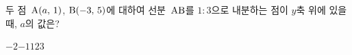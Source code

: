 두 점~$\mathrm{A}(a,\,1)$, $\mathrm{B}(-3,\,5)$에 대하여 선분~$\mathrm{AB}$를 $1:3$으로 내분하는 점이 $y$축 위에 있을 때, $a$의 값은?
\begin{choices32}{$-2$}{$-1$}{$1$}{$2$}{$3$}\end{choices32}
